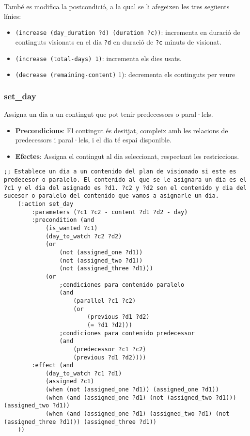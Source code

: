 \documentclass[a4paper]{article}
\begin{document}
	\noindent També es modifica la postcondició, a la qual se li afegeixen les tres següents línies:
	
	\begin{itemize}[label={}, leftmargin=1.5em, itemsep=0pt]
		\item \texttt{(increase (day\_duration ?d) (duration ?c))}: incrementa en duració de continguts visionats en el dia \texttt{?d} en duració de \texttt{?c} minuts de visionat.
		
		\item \texttt{(increase (total-days) 1)}: incrementa els dies usats.
		
		\item \texttt{(decrease (remaining-content)} 1): decrementa els continguts per veure
	\end{itemize}
	
	\subsubsection*{set\_day}
	Assigna un dia a un contingut que pot tenir predecessors o paral·lels.
	
	\begin{itemize}
		\item \textbf{Precondicions}: El contingut és desitjat, compleix amb les relacions de predecessors i paral·lels, i el dia té espai disponible.
		\item \textbf{Efectes}: Assigna el contingut al dia seleccionat, respectant les restriccions.
	\end{itemize}
	
	\begin{lstlisting}[language=PDDL, caption={Acció set\_day}, label={lst:set_day}]
	;; Establece un dia a un contenido del plan de visionado si este es predecesor o paralelo. El contenido al que se le asignara un dia es el ?c1 y el dia del asignado es ?d1. ?c2 y ?d2 son el contenido y dia del sucesor o paralelo del contenido que vamos a asignarle un dia.
	(:action set_day
		:parameters (?c1 ?c2 - content ?d1 ?d2 - day)
		:precondition (and 
			(is_wanted ?c1)
			(day_to_watch ?c2 ?d2)
			(or 
				(not (assigned_one ?d1))
				(not (assigned_two ?d1))
				(not (assigned_three ?d1)))
			(or 
				;condiciones para contenido paralelo
				(and
					(parallel ?c1 ?c2)
					(or 
						(previous ?d1 ?d2)
						(= ?d1 ?d2)))
				;condiciones para contenido predecessor
				(and
					(predecessor ?c1 ?c2)
					(previous ?d1 ?d2))))
		:effect (and 
			(day_to_watch ?c1 ?d1)
			(assigned ?c1)
			(when (not (assigned_one ?d1)) (assigned_one ?d1))
			(when (and (assigned_one ?d1) (not (assigned_two ?d1))) (assigned_two ?d1))
			(when (and (assigned_one ?d1) (assigned_two ?d1) (not (assigned_three ?d1))) (assigned_three ?d1))
	))
	\end{lstlisting}
	
\end{document}
